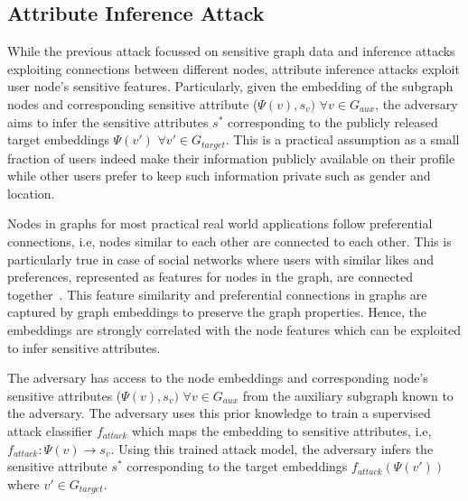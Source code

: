 


\subsection{Attribute Inference Attack}

While the previous attack focussed on sensitive graph data and inference attacks exploiting connections between different nodes, attribute inference attacks exploit user node's sensitive features.
Particularly, given the embedding of the subgraph nodes and corresponding sensitive attribute ($\Psi (v), s_{v})$ $\forall v \in G_{aux}$, the adversary aims to infer the sensitive attributes $s^*$ corresponding to the publicly released target embeddings $\Psi (v')$ $\forall v' \in G_{target}$.
This is a practical assumption as a small fraction of users indeed make their information publicly available on their profile while other users prefer to keep such information private such as gender and location.

Nodes in graphs for most practical real world applications follow preferential connections, i.e, nodes similar to each other are connected to each other.
This is particularly true in case of social networks where users with similar likes and preferences, represented as features for nodes in the graph, are connected together~\cite{socialinfer,socialinfer2}.
This feature similarity and preferential connections in graphs are captured by graph embeddings to preserve the graph properties.
Hence, the embeddings are strongly correlated with the node features which can be exploited to infer sensitive attributes.

The adversary has access to the node embeddings and corresponding node's sensitive attributes ($\Psi (v), s_{v})$ $\forall v \in G_{aux}$ from the auxiliary subgraph known to the adversary.
The adversary uses this prior knowledge to train a supervised attack classifier $f_{attack}$ which maps the embedding to sensitive attributes, i.e, $f_{attack}: \Psi (v) \rightarrow s_{v}$.
Using this trained attack model, the adversary infers the sensitive attribute $s^*$ corresponding to the target embeddings $f_{attack}(\Psi(v'))$ where $v' \in G_{target}$.
